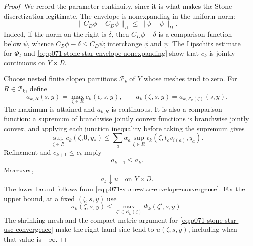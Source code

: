 \begin{proof}
We record the parameter continuity, since it is what makes the Stone
discretization legitimate.  The envelope is nonexpanding in the uniform
norm:
\begin{equation}
 \lVert C_D\phi-C_D\psi\rVert_D
       \leq\lVert\phi-\psi\rVert_D.
 \label{eq:p071-stone-star-envelope-nonexpanding}
\end{equation}
Indeed, if the norm on the right is \(\delta\), then
\(C_D\phi-\delta\) is a comparison function below \(\psi\), whence
\(C_D\phi-\delta\leq C_D\psi\); interchange \(\phi\) and \(\psi\).
The Lipschitz estimate for \(\Phi_k\) and
\eqref{eq:p071-stone-star-envelope-nonexpanding} show that \(c_k\) is
jointly continuous on \(Y\times D\).

Choose nested finite clopen partitions \(\mathscr P_k\) of \(Y\) whose
meshes tend to zero.  For \(R\in\mathscr P_k\), define
\begin{equation}
 a_{k,R}(s,y)=\max_{\zeta\in R}c_k(\zeta,s,y),
 \qquad
 a_k(\zeta,s,y)=a_{k,R_k(\zeta)}(s,y).
 \label{eq:p071-stone-star-clopen-envelope}
\end{equation}
The maximum is attained and \(a_{k,R}\) is continuous.  It is also a
comparison function: a supremum of branchwise jointly convex functions is
branchwise jointly convex, and applying each junction inequality before
taking the supremum gives
\[
 \sup_{\zeta\in R}c_k(\zeta,0,y_*)
 \leq \sum_a\alpha_a
          \sup_{\zeta\in R}c_k(\zeta,t_av_{i(a)},y_a).
\]
Refinement and \(c_{k+1}\leq c_k\) imply
\begin{equation}
                             a_{k+1}\leq a_k.
 \label{eq:p071-stone-star-clopen-monotonicity}
\end{equation}
Moreover,
\begin{equation}
                             a_k\downarrow\bar u
                             \quad\text{on }Y\times D.
 \label{eq:p071-stone-star-clopen-convergence}
\end{equation}
The lower bound follows from
\eqref{eq:p071-stone-star-envelope-convergence}.  For the upper bound, at a
fixed \((\zeta,s,y)\) use
\[
 a_k(\zeta,s,y)
 \leq\max_{\zeta'\in R_k(\zeta)}
              \Phi_k(\zeta',s,y).
\]
The shrinking mesh and the compact-metric argument for
\eqref{eq:p071-stone-star-usc-convergence} make the right-hand side tend to
\(\bar u(\zeta,s,y)\), including when that value is \(-\infty\).


\end{proof}
